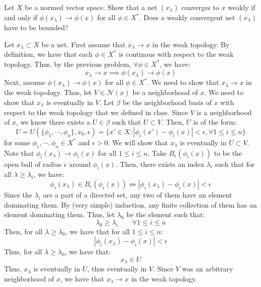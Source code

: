 \documentclass[12pt]{article}
\begin{document}
\begin{problem}{49}
    Let $X$ be a normed vector space. Show that a net $(x_\lambda)$ converges to $x$ weakly if and only if $\phi(x_\lambda) \to \phi(x)$ for all $\phi \in X^*$. Does a weakly convergent net $(x_\lambda)$ have to be bounded?
\end{problem}
\begin{solution}
    Let $x_\lambda \subset X$ be a net. \bbni 
    First assume that $x_\lambda \to x$ in the weak topology. By definition, we have that each $\phi \in X^*$ is continous with respect to the weak topology. Thus, by the previous problem, $\forall \phi \in X^*$, we have:
    \[ x_\lambda \to x \implies \phi(x_\lambda) \to \phi(x)\] 
    Next, assume $\phi(x_\lambda) \to \phi(x)$ for all $\phi \in X^*$. We need to show that $x_\lambda \to x$ in the weak topology. Thus, let $V \in \mathcal N(x)$ be a neighborhood of $x$. We need to show that $x_\lambda$ is eventually in $V$. \bbni
    Let $\beta$ be the neighborhood basis of $x$ with respect to the weak topology that we defined in class. Since $V$ is a neighborhood of $x$, we know there exists a $U \in \beta$ such that $U \subset V$. Then, $U$ is of the form: 
    \[ U = U(\{\phi_1, \cdots, \phi_n\}, x_0, \epsilon) = \{x' \in X: |\phi_i(x')-\phi_i(x)| < \epsilon, \forall 1 \leq i \leq n\}\]
    for some $\phi_1, \cdots, \phi_n \in X^*$ and $\epsilon > 0$. We will show that $x_\lambda$ is eventually in $U \subset V$. \bbni
    Note that $\phi_i(x_\lambda) \to \phi_i(x)$ for all $1 \leq i \leq n$. Take $B_\epsilon(\phi_i(x))$ to be the open ball of radius $\epsilon$ around $\phi_i(x)$. Then, there exists an index $\lambda_i$ such that for all $\lambda \geq \lambda_i$, we have:
    \[ \phi_i(x_\lambda) \in B_\epsilon(\phi_i(x)) \iff |\phi_i(x_\lambda) - \phi_i(x)| < \epsilon \]
    Since the $\lambda_i$ are a part of a directed set, any two of them have an element dominating them. By (very simple) induction, any finite collection of them has an element dominating them. Thus, let $\lambda_0$ be the element such that: 
    \[ \lambda_0 \geq \lambda_i \qquad \forall 1 \leq i \leq n \]
    Then, for all $\lambda \geq \lambda_0$, we have that for all $1 \leq i \leq n$: 
    \[ |\phi_i(x_\lambda) - \phi_i(x)| < \epsilon \]
    Thus, for all $\lambda \geq \lambda_0$, we have that:
    \[ x_\lambda \in U\]
    Thus, $x_\lambda$ is eventually in $U$, thus eventually in $V$. Since $V$ was an arbitrary neighborhood of $x$, we have that $x_\lambda \to x$ in the weak topology. 
\end{solution}
\newpage
\end{document}
